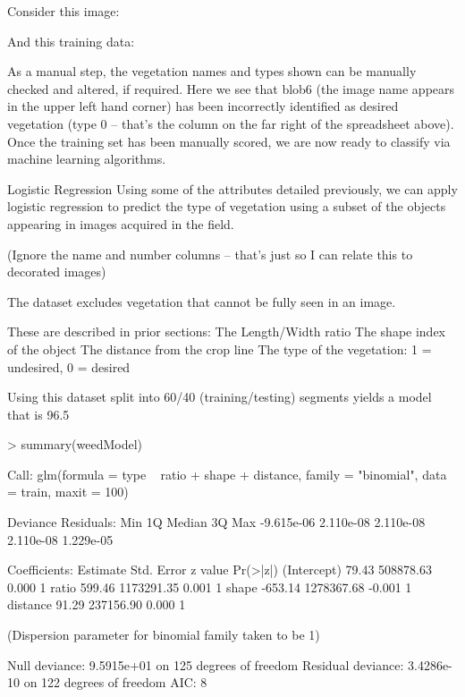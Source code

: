 \documentclass[letterpaper]{article}
\begin{document}
Consider this image:



And this training data:



As a manual step, the vegetation names and types shown can be manually checked and altered, if required. Here we see that blob6 (the image name appears in the upper left hand corner) has been incorrectly identified as desired vegetation (type 0 -- that’s the column on the far right of the spreadsheet above). Once the training set has been manually scored, we are now ready to classify via machine learning algorithms.


Logistic Regression
Using some of the attributes detailed previously, we can apply logistic regression to predict the type of vegetation using a subset of the objects appearing in images acquired in the field.




(Ignore the name and number columns -- that’s just so I can relate this to decorated images)

The dataset excludes vegetation that cannot be fully seen in an image.

These are described in prior sections:
The Length/Width ratio
The shape index of the object
The distance from the crop line
The type of the vegetation: 1 = undesired, 0 = desired

Using this dataset split into 60/40 (training/testing) segments yields a model that is 96.5 %

> summary(weedModel)

Call:
glm(formula = type ~ ratio + shape + distance, family = "binomial", 
    data = train, maxit = 100)

Deviance Residuals: 
       Min          1Q      Median          3Q         Max  
-9.615e-06   2.110e-08   2.110e-08   2.110e-08   1.229e-05  

Coefficients:
              Estimate Std. Error z value Pr(>|z|)
(Intercept)      79.43  508878.63   0.000        1
ratio           599.46 1173291.35   0.001        1
shape          -653.14 1278367.68  -0.001        1
distance         91.29  237156.90   0.000        1

(Dispersion parameter for binomial family taken to be 1)

    Null deviance: 9.5915e+01  on 125  degrees of freedom
Residual deviance: 3.4286e-10  on 122  degrees of freedom
AIC: 8
\end{document}

